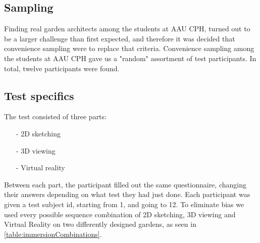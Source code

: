 \subsection{Sampling}
Finding real garden architects among the students at AAU CPH, turned out to be a larger challenge than first expected, and therefore it was decided that convenience sampling were to replace that criteria. Convenience sampling among the students at AAU CPH gave us a "random" assortment of test participants. In total, twelve participants were found.

\subsection{Test specifics}
The test consisted of three parts:
\begin{itemize}
	\item[-] 2D sketching
	\item[-] 3D viewing
	\item[-] Virtual reality
\end{itemize}
Between each part, the participant filled out the same questionnaire, changing their answers depending on what test they had just done. Each participant was given a test subject id, starting from 1, and going to 12. To eliminate bias we used every possible sequence combination of 2D sketching, 3D viewing and Virtual Reality on two differently designed gardens, as seen in \autoref{table:immersionCombinations}.

